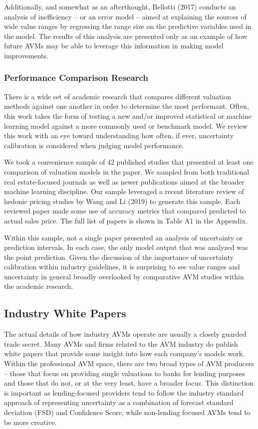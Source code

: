 \documentclass[colTwo]{format}
\theoremstyle{definition}
\begin{document}
Additionally, and somewhat as an afterthought, Bellotti (2017) conducts an analysis of inefficiency -- or an error model -- aimed at explaining the sources of wide value ranges by regressing the range size on the predictive variables used in the model.  The results of this analysis are presented only as an example of how future AVMs may be able to leverage this information in making model improvements. 

\subsubsection{Performance Comparison Research}

There is a wide set of academic research that compares different valuation methods against one another in order to determine the most performant.  Often, this work takes the form of testing a new and/or improved statistical or machine learning model against a more commonly used or benchmark model.  We review this work with an eye toward understanding how often, if ever, uncertainty calibration is considered when judging model performance. 

We took a convenience sample of 42 published studies that presented at least one comparison of valuation models in the paper. We sampled from both traditional real estate-focused journals as well as newer publications aimed at the broader machine learning discipline. Our sample leveraged a recent literature review of hedonic pricing studies by Wang and Li (2019) to generate this sample.  Each reviewed paper made some use of accuracy metrics that compared predicted to actual sales price.  The full list of papers is shown in Table A1 in the Appendix. 

Within this sample, not a single paper presented an analysis of uncertainty or prediction intervals. In each case, the only model output that was analyzed was the point prediction.  Given the discussion of the importance of uncertainty calibration within industry guidelines, it is surprising to see value ranges and uncertainty in general broadly overlooked by comparative AVM studies within the academic research.  

\subsection{Industry White Papers}

The actual details of how industry AVMs operate are usually a closely guarded trade secret. Many AVMs and firms related to the AVM industry do publish white papers that provide some insight into how each company’s models work.   Within the professional AVM space, there are two broad types of AVM producers -- those that focus on providing single valuations to banks for lending purposes and those that do not, or at the very least, have a broader focus.  This distinction is important as lending-focused providers tend to follow the industry standard approach of representing uncertainty as a combination of forecast standard deviation (FSD) and Confidence Score, while non-lending focused AVMs tend to be more creative.
\end{document}
